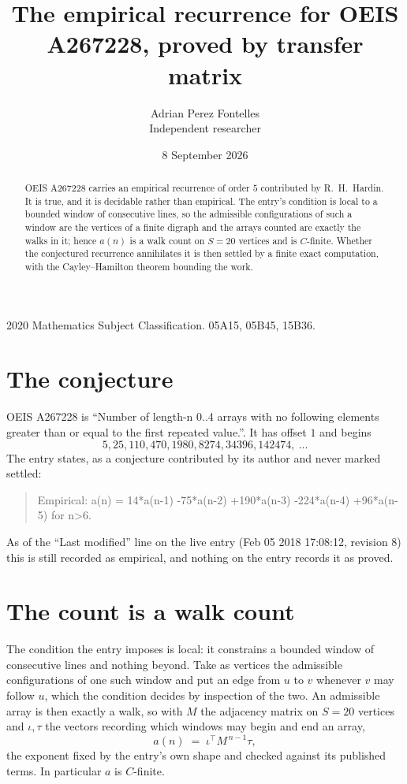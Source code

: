 \documentclass[11pt,a4paper]{article}
\title{The empirical recurrence for OEIS A267228, proved by transfer matrix}
\author{Adrian Perez Fontelles\\ \small Independent researcher}
\date{8 September 2026}
\theoremstyle{plain}
\theoremstyle{definition}
\begin{document}
\maketitle

\begin{abstract}
OEIS A267228 carries an empirical recurrence of order $5$ contributed by R.~H.~Hardin. It is
true, and it is decidable rather than empirical. The entry's condition is local to a bounded window of consecutive lines, so
the admissible configurations of such a window are the vertices of a finite digraph and the
arrays counted are exactly the walks in it; hence $a(n)$ is a walk count on $S=20$ vertices
and is $C$-finite. Whether the conjectured recurrence annihilates it is then settled by a
finite exact computation, with the Cayley--Hamilton theorem bounding the work.
\end{abstract}

\noindent\small 2020 Mathematics Subject Classification. 05A15, 05B45, 15B36.\normalsize

\section{The conjecture}

OEIS A267228 is ``Number of length-n 0..4 arrays with no following elements greater than or equal to the first repeated value.''. It has offset $1$ and begins
\[
5, 25, 110, 470, 1980, 8274, 34396, 142474,\ \dots
\]
The entry states, as a conjecture contributed by its author and never marked settled:
\begin{quote}
Empirical: a(n) = 14*a(n-1) -75*a(n-2) +190*a(n-3) -224*a(n-4) +96*a(n-5) for n>6.
\end{quote}
As of the ``Last modified'' line on the live entry (Feb 05 2018 17:08:12, revision 8) this is still
recorded as empirical, and nothing on the entry records it as proved.

\section{The count is a walk count}

The condition the entry imposes is local: it constrains a bounded window of consecutive lines and nothing beyond. Take as
vertices the admissible configurations of one such window and put an edge from $u$ to $v$
whenever $v$ may follow $u$, which the condition decides by inspection of the two. An
admissible array is then exactly a walk, so with $M$ the adjacency matrix on $S=20$ vertices
and $\iota,\tau$ the vectors recording which windows may begin and end an array,
\[
a(n)\;=\;\iota^{\!\top}M^{\,n-1}\tau ,
\]
the exponent fixed by the entry's own shape and checked against its published terms. In
particular $a$ is $C$-finite.
\end{document}
